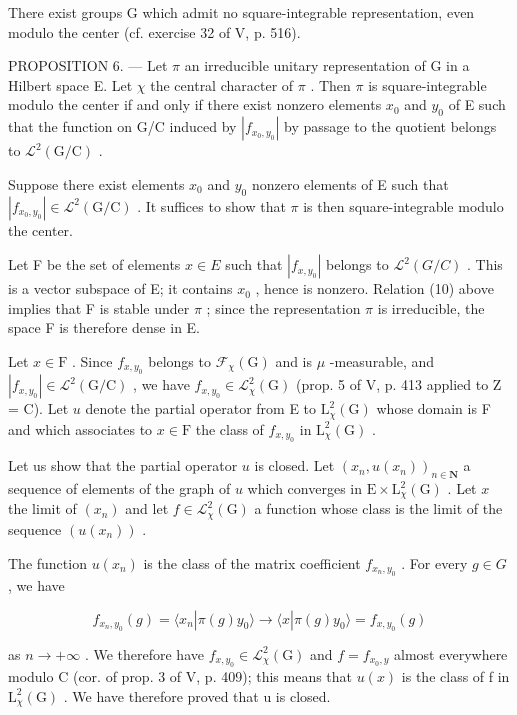 There exist groups G which admit no square-integrable representation, even modulo the center (cf. exercise 32 of V, p. 516).

PROPOSITION 6. --- Let \(\pi\) an irreducible unitary representation of G in a Hilbert space E. Let \(\chi\) the central character of \(\pi\) . Then \(\pi\) is square-integrable modulo the center if and only if there exist nonzero elements \(x_0\) and \(y_0\) of E such that the function on G/C induced by \(|f_{x_0,y_0}|\) by passage to the quotient belongs to \(\mathcal{L}^2 (\mathrm{G / C})\) .

Suppose there exist elements \(x_{0}\) and \(y_{0}\) nonzero elements of E such that \(|f_{x_{0},y_{0}}| \in \mathcal{L}^{2}(\mathrm{G/C})\) . It suffices to show that \(\pi\) is then square-integrable modulo the center.

 Let F be the set of elements \(x \in E\) such that \(|f_{x,y_{0}}|\) belongs to \(\mathcal{L}^{2}(G/C)\) . This is a vector subspace of E; it contains \(x_{0}\) , hence is nonzero. Relation (10) above implies that F is stable under \(\pi\) ; since the representation \(\pi\) is irreducible, the space F is therefore dense in E.

 Let \(x \in \mathrm{F}\) . Since \(f_{x,y_0}\) belongs to \(\mathcal{F}_{\chi}(\mathrm{G})\) and is \(\mu\) -measurable, and \(|f_{x,y_0}| \in \mathcal{L}^2(\mathrm{G/C})\) , we have \(f_{x,y_0} \in \mathcal{L}_{\chi}^2(\mathrm{G})\) (prop. 5 of V, p. 413 applied to Z = C). Let \(u\) denote the partial operator from E to \(\mathrm{L}_{\chi}^{2}(\mathrm{G})\) whose domain is F and which associates to \(x \in \mathrm{F}\) the class of \(f_{x,y_0}\) in \(\mathrm{L}_{\chi}^{2}(\mathrm{G})\) .

 Let us show that the partial operator \(u\) is closed. Let \((x_{n}, u(x_{n}))_{n \in \mathbf{N}}\) a sequence of elements of the graph of \(u\) which converges in \(\mathrm{E} \times \mathrm{L}_{\chi}^{2}(\mathrm{G})\) . Let \(x\) the limit of \((x_{n})\) and let \(f \in \mathcal{L}_{\chi}^{2}(\mathrm{G})\) a function whose class is the limit of the sequence \((u(x_{n}))\) .

The function \(u(x_{n})\) is the class of the matrix coefficient \(f_{x_{n},y_{0}}\) . For every \(g \in G\) , we have

\[
f _ {x _ {n}, y _ {0}} (g) = \langle x _ {n} | \pi (g) y _ {0} \rangle \rightarrow \langle x | \pi (g) y _ {0} \rangle = f _ {x, y _ {0}} (g)
\]

as \(n \to +\infty\) . We therefore have \(f_{x,y_{0}} \in \mathcal{L}_{\chi}^{2}(\mathrm{G})\) and \(f = f_{x_{0},y}\) almost everywhere modulo C (cor. of prop. 3 of V, p. 409); this means that \(u(x)\) is the class of f in \(\mathrm{L}_{\chi}^{2}(\mathrm{G})\) . We have therefore proved that u is closed.

